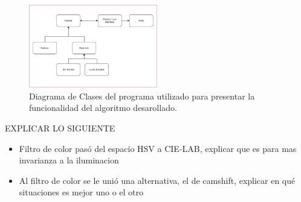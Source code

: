 \begin{figure}
	\centering
	\includegraphics[width=0.5\textwidth]{Imagenes/classd.png}
	\caption{Diagrama de Clases del programa utilizado para presentar la funcionalidad del algoritmo desarollado.}
	\label{fig:class}
\end{figure}
EXPLICAR LO SIGUIENTE
\begin{itemize}
\item Filtro de color pasó del espacio HSV a CIE-LAB, explicar que es para mas invarianza a la iluminacion
\item Al filtro de color se le unió una alternativa, el de camshift, explicar en qué situaciones es mejor uno o el otro
\end{itemize}
